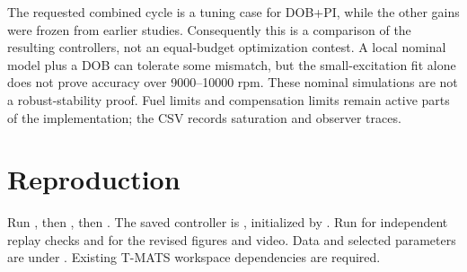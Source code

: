 The requested combined cycle is a tuning case for DOB+PI, while the other gains were frozen from earlier studies. Consequently this is a comparison of the resulting controllers, not an equal-budget optimization contest. A local nominal model plus a DOB can tolerate some mismatch, but the small-excitation fit alone does not prove accuracy over 9000--10000 rpm. These nominal simulations are not a robust-stability proof. Fuel limits and compensation limits remain active parts of the implementation; the CSV records saturation and observer traces.
\section{Reproduction}
Run , then , then . The saved controller is , initialized by . Run  for independent replay checks and  for the revised figures and video. Data and selected parameters are under . Existing T-MATS workspace dependencies are required.
